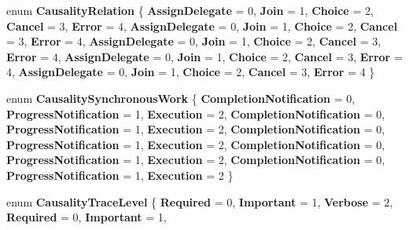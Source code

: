 \begin{DoxyCompactItemize}
enum {\bfseries Causality\+Relation} \{ \newline
{\bfseries Assign\+Delegate} = 0, 
{\bfseries Join} = 1, 
{\bfseries Choice} = 2, 
{\bfseries Cancel} = 3, 
\newline
{\bfseries Error} = 4, 
{\bfseries Assign\+Delegate} = 0, 
{\bfseries Join} = 1, 
{\bfseries Choice} = 2, 
\newline
{\bfseries Cancel} = 3, 
{\bfseries Error} = 4, 
{\bfseries Assign\+Delegate} = 0, 
{\bfseries Join} = 1, 
\newline
{\bfseries Choice} = 2, 
{\bfseries Cancel} = 3, 
{\bfseries Error} = 4, 
{\bfseries Assign\+Delegate} = 0, 
\newline
{\bfseries Join} = 1, 
{\bfseries Choice} = 2, 
{\bfseries Cancel} = 3, 
{\bfseries Error} = 4, 
\newline
{\bfseries Assign\+Delegate} = 0, 
{\bfseries Join} = 1, 
{\bfseries Choice} = 2, 
{\bfseries Cancel} = 3, 
\newline
{\bfseries Error} = 4
 \}
\item 
\mbox{\label{namespace_windows_1_1_foundation_1_1_diagnostics_a63986dc9acde6ceb9a128207a5bd1e56}} 
enum {\bfseries Causality\+Synchronous\+Work} \{ \newline
{\bfseries Completion\+Notification} = 0, 
{\bfseries Progress\+Notification} = 1, 
{\bfseries Execution} = 2, 
{\bfseries Completion\+Notification} = 0, 
\newline
{\bfseries Progress\+Notification} = 1, 
{\bfseries Execution} = 2, 
{\bfseries Completion\+Notification} = 0, 
{\bfseries Progress\+Notification} = 1, 
\newline
{\bfseries Execution} = 2, 
{\bfseries Completion\+Notification} = 0, 
{\bfseries Progress\+Notification} = 1, 
{\bfseries Execution} = 2, 
\newline
{\bfseries Completion\+Notification} = 0, 
{\bfseries Progress\+Notification} = 1, 
{\bfseries Execution} = 2
 \}
\item 
\mbox{\label{namespace_windows_1_1_foundation_1_1_diagnostics_aa82022f66e6c5b053464b95c6479f156}} 
enum {\bfseries Causality\+Trace\+Level} \{ \newline
{\bfseries Required} = 0, 
{\bfseries Important} = 1, 
{\bfseries Verbose} = 2, 
{\bfseries Required} = 0, 
\newline
{\bfseries Important} = 1, 

\end{DoxyCompactItemize}
